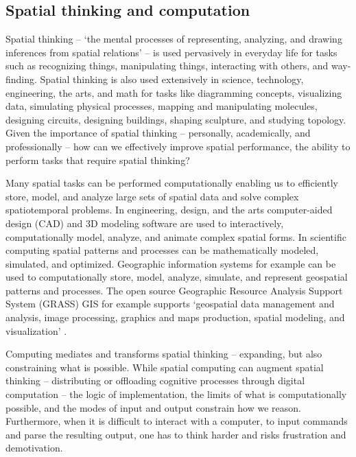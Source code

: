 \documentclass[prodmode,acmtochi]{acmsmall} %
\begin{document}
 

\subsection{Spatial thinking and computation}

Spatial thinking -- `the mental processes of representing, analyzing, and drawing inferences from spatial relations' \cite{Uttal2013} -- is used pervasively in everyday life %
for tasks such as recognizing things, manipulating things, interacting with others, and way-finding. 
%
Spatial thinking is also used extensively in science, technology, engineering, the arts, and math 
for tasks like 
diagramming concepts, 
visualizing data, %
simulating physical processes,
mapping and manipulating molecules,
designing circuits, 
designing buildings, 
shaping sculpture,
and studying topology. 
%
Given the importance of spatial thinking -- personally, academically, and professionally -- 
how can we effectively improve spatial performance, the ability to perform tasks that require spatial thinking? 


Many spatial tasks can be performed computationally 
enabling us to efficiently store, model, and analyze large sets of spatial data 
and solve complex spatiotemporal problems.
%
In engineering, design, and the arts 
computer-aided design (CAD) and 3D modeling software are used to interactively, computationally model, analyze, and animate complex spatial forms. 
%
In scientific computing spatial patterns and processes can be mathematically modeled, simulated, and optimized. 
%
Geographic information systems for example can be used to computationally store, model, analyze, simulate, and represent geospatial patterns and processes. 
%
The open source 
Geographic Resource Analysis Support System (GRASS) GIS for example supports 
`geospatial data management and analysis, image processing, graphics and maps production, spatial modeling, and visualization' \cite{GRASS}. 

Computing mediates and transforms spatial thinking -- expanding, but also constraining what is possible.
%
While spatial computing can augment spatial thinking 
-- distributing or offloading cognitive processes through digital computation -- 
the logic of implementation,
the limits of what is computationally possible, 
and the modes of input and output
constrain how we reason. %
%
Furthermore, 
when it is difficult to interact with a computer, 
to input commands and parse the resulting output, 
one has to think harder 
and risks frustration and demotivation. %
\end{document}

